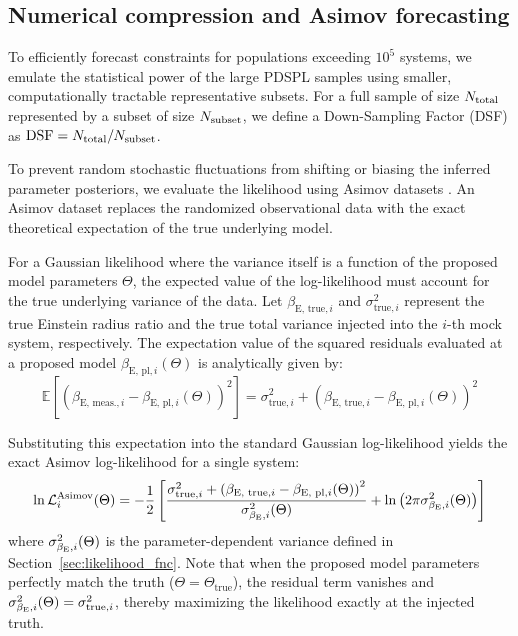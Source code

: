 \documentclass[a4paper,11pt]{article}
\begin{document}
\begin{appendix}


\section{Numerical compression and Asimov forecasting}
\label{app:numerical_compression}

To efficiently forecast constraints for populations exceeding $10^5$ systems, we emulate the statistical power of the large PDSPL samples using smaller, computationally tractable representative subsets. For a full sample of size $N_{\rm total}$ represented by a subset of size $N_{\rm subset}$, we define a Down-Sampling Factor (DSF) as $\mathrm{DSF} = N_{\rm total} / N_{\rm subset}$.

To prevent random stochastic fluctuations from shifting or biasing the inferred parameter posteriors, we evaluate the likelihood using Asimov datasets \citep{Cowan:2011}. An Asimov dataset replaces the randomized observational data with the exact theoretical expectation of the true underlying model. 

For a Gaussian likelihood where the variance itself is a function of the proposed model parameters $\Theta$, the expected value of the log-likelihood must account for the true underlying variance of the data. Let $\beta_{\text{E, true}, i}$ and $\sigma_{\text{true}, i}^2$ represent the true Einstein radius ratio and the true total variance injected into the $i$-th mock system, respectively. The expectation value of the squared residuals evaluated at a proposed model $\beta_{\text{E, pl}, i}(\Theta)$ is analytically given by:
\begin{equation}
    \mathbb{E}\left[ \left(\beta_{\text{E, meas.}, i} - \beta_{\text{E, pl}, i}(\Theta)\right)^2 \right] = \sigma_{\text{true}, i}^2 + \left( \beta_{\text{E, true}, i} - \beta_{\text{E, pl}, i}(\Theta) \right)^2
\end{equation}

Substituting this expectation into the standard Gaussian log-likelihood yields the exact Asimov log-likelihood for a single system:
\begin{equation}
    \ln \mathcal{L}_i^{\text{Asimov}}(\Theta) = -\frac{1}{2} \left[ \frac{\sigma_{\text{true}, i}^2 + \left( \beta_{\text{E, true}, i} - \beta_{\text{E, pl}, i}(\Theta) \right)^2}{\sigma_{\beta_{\rm E}, i}^2(\Theta)} + \ln\left(2\pi\sigma_{\beta_{\rm E}, i}^2(\Theta)\right) \right]
\end{equation}
where $\sigma_{\beta_{\rm E}, i}^2(\Theta)$ is the parameter-dependent variance defined in Section~\ref{sec:likelihood_fnc}. Note that when the proposed model parameters perfectly match the truth ($\Theta = \Theta_{\text{true}}$), the residual term vanishes and $\sigma_{\beta_{\rm E}, i}^2(\Theta) = \sigma_{\text{true}, i}^2$, thereby maximizing the likelihood exactly at the injected truth.


\end{appendix}
\end{document}
